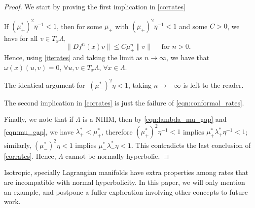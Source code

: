 \documentclass[11pt]{amsart}
\theoremstyle{definition}
\theoremstyle{remark}
\numberwithin{equation}{section}
\begin{document}
  \begin{proof}
    We start by proving  the first implication in  \eqref{corrates}


  If  $ (\mu_+^* )^2 \eta^{-1} < 1 $,
 then for some $\mu_+$  with
     $(\mu_+ )^2 \eta^{-1} < 1 $ and some $C>0$, we
  have for all $v \in T_x \Lambda$,
  \[
  \| Df^n(x) v\|  \le C \mu_+^n  \|v\| \quad \textrm{ for } n > 0 .
  \]
  Hence, using \eqref{iterates} and taking the limit as $n \to \infty$,
  we have that $\omega(x)(u,v) = 0$, $ \forall u,v \in T_x\Lambda$, $\forall x \in
  \Lambda$.

  The identical argument for
$ \ (\mu_-^* )^2 \eta < 1$, taking $n \to -\infty$ is left to the reader.


  The second implication in  \eqref{corrates}
  is just the failure  of  \eqref{eqn:conformal_rates}.

  Finally, we note that if $\Lambda$ is a NHIM, then by \eqref{eqn:lambda_mu_gap} and \eqref{eqn:mu_gap},   we have $\lambda_+^*<\mu_+^*$, therefore
  $(\mu_+^* )^2 \eta^{-1}< 1$   implies  $\mu_+^* \lambda_+^*  \eta^{-1} < 1$;
  similarly, $(\mu_-^* )^2 \eta < 1$   implies  $\mu_-^*  \lambda_-^* \eta < 1$. This contradicts the last conclusion of \eqref{corrates}.
  Hence, $\Lambda$ cannot be normally hyperbolic.
\end{proof}

  Isotropic, specially Lagrangian manifolds have extra properties
  among rates that are incompatible with normal hyperbolicity.
  In this paper, we will only mention an example,
  and postpone a fuller exploration involving other
  concepts to future work.
\end{document}
